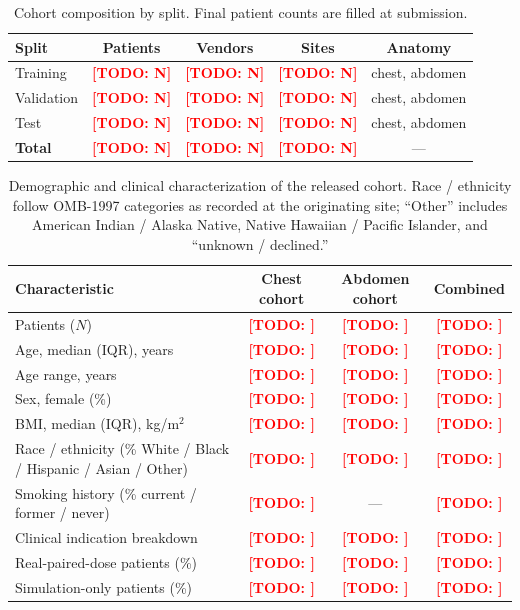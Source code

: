 \documentclass[twoside,11pt]{article}
\newcommand{\todo}[1]{\textcolor{red}{\textbf{[TODO: #1]}}}
\begin{document}
\begin{table}[h]
    \centering
    \small
    \begin{tabular}{lcccc}
        \toprule
        \textbf{Split} & \textbf{Patients} & \textbf{Vendors} & \textbf{Sites} & \textbf{Anatomy} \\
        \midrule
        Training        & \todo{N} & \todo{N} & \todo{N} & chest, abdomen \\
        Validation      & \todo{N} & \todo{N} & \todo{N} & chest, abdomen \\
        Test            & \todo{N} & \todo{N} & \todo{N} & chest, abdomen \\
        \textbf{Total}  & \todo{N} & \todo{N} & \todo{N} & --- \\
        \bottomrule
    \end{tabular}
    \caption{Cohort composition by split. Final patient counts are filled at submission.}
    \label{tab:cohort}
\end{table}

\begin{table}[h]
    \centering
    \small
    \setlength{\tabcolsep}{4pt}
    \begin{tabular}{lccc}
        \toprule
        \textbf{Characteristic} & \textbf{Chest cohort} & \textbf{Abdomen cohort} & \textbf{Combined} \\
        \midrule
        Patients ($N$)                            & \todo{} & \todo{} & \todo{} \\
        Age, median (IQR), years                   & \todo{} & \todo{} & \todo{} \\
        Age range, years                           & \todo{} & \todo{} & \todo{} \\
        Sex, female (\%)                           & \todo{} & \todo{} & \todo{} \\
        BMI, median (IQR), kg/m$^2$                & \todo{} & \todo{} & \todo{} \\
        Race / ethnicity (\% White / Black / Hispanic / Asian / Other) & \todo{} & \todo{} & \todo{} \\
        Smoking history (\% current / former / never) & \todo{} & --- & \todo{} \\
        Clinical indication breakdown              & \todo{} & \todo{} & \todo{} \\
        Real-paired-dose patients (\%)             & \todo{} & \todo{} & \todo{} \\
        Simulation-only patients (\%)              & \todo{} & \todo{} & \todo{} \\
        \bottomrule
    \end{tabular}
    \caption{Demographic and clinical characterization of the released cohort. Race / ethnicity follow OMB-1997 categories as recorded at the originating site; ``Other'' includes American Indian / Alaska Native, Native Hawaiian / Pacific Islander, and ``unknown / declined.''}
    \label{tab:demographics}
\end{table}
\end{document}

